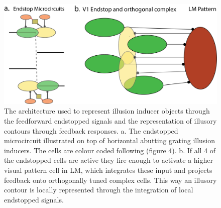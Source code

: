 \documentclass[12pt]{article}
\begin{document}
\vspace{20pt}
\begin{figure}[H]
  \centering
  \includegraphics[width=1 \textwidth]{adjusted_figures/illusory_filling.png}
  \caption{The architecture used to represent illusion inducer objects through the feedforward endstopped signals and the representation of illusory contours through feedback responses. a. The endstopped microcircuit illustrated on top of horizontal abutting grating illusion inducers. The cells are colour coded following \hyperref[fig:LIF_Overview](figure 4). b. If all 4 of the endstopped cells are active they fire enough to activate a higher visual pattern cell in LM, which integrates these input and projects feedback onto orthogonally tuned complex cells. This way an illusory contour is locally represented through the integration of local endstopped signals.}
  \label{fig:illusory_filling}
\end{figure}
\newpage
\end{document}
